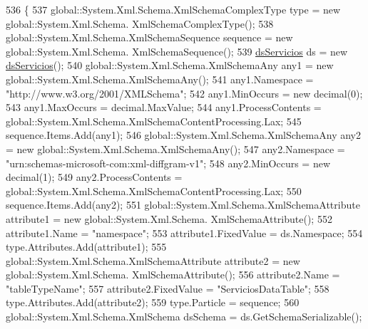 \begin{DoxyCode}
536                                                                                                            
                               \{
537                 global::System.Xml.Schema.XmlSchemaComplexType type = \textcolor{keyword}{new} global::System.Xml.Schema.
      XmlSchemaComplexType();
538                 global::System.Xml.Schema.XmlSchemaSequence sequence = \textcolor{keyword}{new} global::System.Xml.Schema.
      XmlSchemaSequence();
539                 \hyperlink{class_proyecto___integrador__3_1_1ds_servicios_a0734e62bba29ca7515ed72f2aee94662}{dsServicios} ds = \textcolor{keyword}{new} \hyperlink{class_proyecto___integrador__3_1_1ds_servicios_a0734e62bba29ca7515ed72f2aee94662}{dsServicios}();
540                 global::System.Xml.Schema.XmlSchemaAny any1 = \textcolor{keyword}{new} global::System.Xml.Schema.XmlSchemaAny();
541                 any1.Namespace = \textcolor{stringliteral}{"http://www.w3.org/2001/XMLSchema"};
542                 any1.MinOccurs = \textcolor{keyword}{new} decimal(0);
543                 any1.MaxOccurs = decimal.MaxValue;
544                 any1.ProcessContents = global::System.Xml.Schema.XmlSchemaContentProcessing.Lax;
545                 sequence.Items.Add(any1);
546                 global::System.Xml.Schema.XmlSchemaAny any2 = \textcolor{keyword}{new} global::System.Xml.Schema.XmlSchemaAny();
547                 any2.Namespace = \textcolor{stringliteral}{"urn:schemas-microsoft-com:xml-diffgram-v1"};
548                 any2.MinOccurs = \textcolor{keyword}{new} decimal(1);
549                 any2.ProcessContents = global::System.Xml.Schema.XmlSchemaContentProcessing.Lax;
550                 sequence.Items.Add(any2);
551                 global::System.Xml.Schema.XmlSchemaAttribute attribute1 = \textcolor{keyword}{new} global::System.Xml.Schema.
      XmlSchemaAttribute();
552                 attribute1.Name = \textcolor{stringliteral}{"namespace"};
553                 attribute1.FixedValue = ds.Namespace;
554                 type.Attributes.Add(attribute1);
555                 global::System.Xml.Schema.XmlSchemaAttribute attribute2 = \textcolor{keyword}{new} global::System.Xml.Schema.
      XmlSchemaAttribute();
556                 attribute2.Name = \textcolor{stringliteral}{"tableTypeName"};
557                 attribute2.FixedValue = \textcolor{stringliteral}{"ServiciosDataTable"};
558                 type.Attributes.Add(attribute2);
559                 type.Particle = sequence;
560                 global::System.Xml.Schema.XmlSchema dsSchema = ds.GetSchemaSerializable();

\end{DoxyCode}
